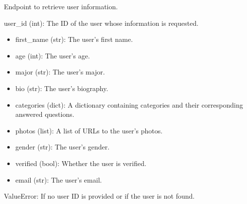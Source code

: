 \documentclass[letterpaper,10pt,english]{sphinxmanual}
\begin{document}
\begin{fulllineitems}
\label{\detokenize{routes.feed:routes.feed.routes.userinfo}}
\pysigstartsignatures
{}
\pysigstopsignatures
\sphinxAtStartPar
Endpoint to retrieve user information.
\begin{description}
\sphinxAtStartPar
user\_id (int): The ID of the user whose information is requested.

\begin{description}
\begin{itemize}
\item {} 
\sphinxAtStartPar
first\_name (str): The user’s first name.

\item {} 
\sphinxAtStartPar
age (int): The user’s age.

\item {} 
\sphinxAtStartPar
major (str): The user’s major.

\item {} 
\sphinxAtStartPar
bio (str): The user’s biography.

\item {} 
\sphinxAtStartPar
categories (dict): A dictionary containing categories and their corresponding answered questions.

\item {} 
\sphinxAtStartPar
photos (list): A list of URLs to the user’s photos.

\item {} 
\sphinxAtStartPar
gender (str): The user’s gender.

\item {} 
\sphinxAtStartPar
verified (bool): Whether the user is verified.

\item {} 
\sphinxAtStartPar
email (str): The user’s email.

\end{itemize}

\end{description}

\sphinxAtStartPar
ValueError: If no user ID is provided or if the user is not found.

\end{description}

\end{fulllineitems}
\end{document}

